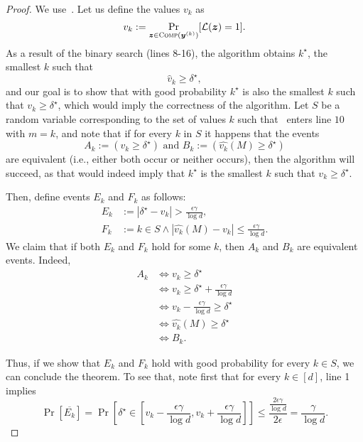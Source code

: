 \begin{proof}


We use~. Let us define the values $v_k$ as
	\[
		v_k := \Pr_{{\bm{z}} \in \textsc{Comp}({\bm{y}}^{(k)})}[\mathcal{L}({\bm{z}}) = 1].
	\]
As a result of the binary search (lines 8-16), the algorithm obtains $k^\star$, the smallest $k$ such that
\[
	\hat{v}_k \geq \delta^\star,
\]
and our goal is to show that with good probability $k^\star$ is also the smallest $k$ such that $v_k \geq \delta^\star$, which would imply the correctness of the algorithm.
Let $S$ be a random variable corresponding to the set of values $k$ such that~ enters line $10$ with $m=k$, and note that if for every $k$ in $S$ it happens that the events 
\[
	A_k := \left(v_k \geq \delta^\star \right) \text{ and }  B_k := \left(\hat{v_k}(M) \geq \delta^\star\right)
\]
are equivalent (i.e., either both occur or neither occurs), then the algorithm will succeed, as that would indeed imply that $k^\star$ is the smallest $k$ such that $v_k \geq \delta^\star$. 

Then, define events $E_k$ and $F_k$ as follows:
\begin{align*}
	E_k &:= |\delta^\star - v_k| > \frac{\epsilon \gamma}{\log d},\\
	F_k &:= k \in S \land |\hat{v_k}(M) - v_k| \leq \frac{\epsilon \gamma}{\log d}.
\end{align*}
We claim that if both $E_k$ and $F_k$ hold for some $k$, then $A_k$ and $B_k$ are equivalent events. Indeed,
\begin{align*}
	A_k &\iff v_k \geq \delta^\star\\
		&\iff v_k \geq \delta^\star + \frac{\epsilon \gamma}{\log d} \tag{By $E_k$}\\
		&\iff v_k - \frac{\epsilon \gamma}{\log d} \geq \delta^\star\\
		&\iff \hat{v_k}(M) \geq \delta^\star \tag{By $F_k$}\\
		&\iff B_k.
\end{align*}

Thus, if we show that $E_k$ and $F_k$ hold with good probability for every $k \in S$, we can conclude the theorem.
To see that, note first that for every $k \in [d]$, line 1 implies
\[
	\Pr[\overline{E_k}] = \Pr\left[\delta^\star \in \left[v_k - \frac{\epsilon \gamma}{\log d}, v_k + \frac{\epsilon \gamma}{\log d}\right]\right] \leq \frac{\frac{2\epsilon \gamma}{\log d}}{2\epsilon} = \frac{\gamma}{\log d}.
\]


\end{proof}
